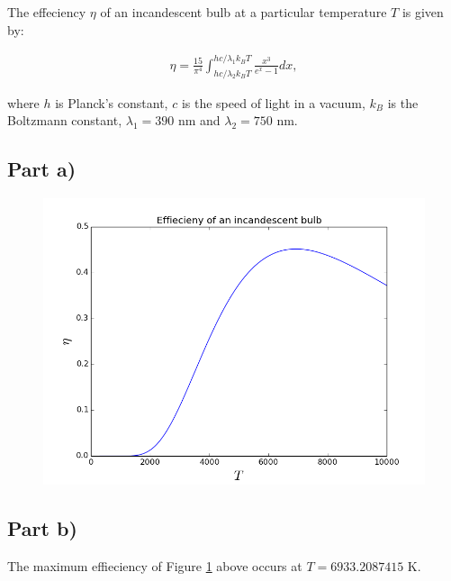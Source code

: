 \documentclass[a4paper,12pt]{article}
\begin{document}
The effeciency $\eta$ of an incandescent bulb at a particular temperature $T$ is given by:

\begin{eqnarray}
\eta = \frac{15}{\pi^4}\int_{hc/\lambda_2 k_B T}^{hc/\lambda_1 k_B T} \frac{x^3}{e^x - 1} dx,
\end{eqnarray}

where $h$ is Planck's constant, $c$ is the speed of light in a vacuum, $k_B$ is the Boltzmann constant, $\lambda_1 = 390$ nm and $\lambda_2 = 750$ nm.

\subsection{Part a)}

\begin{figure}[H]
\centering
\includegraphics[width = \linewidth]{lab4q6a.png}
\caption{}
\label{fig:q6}
\end{figure}

\subsection{Part b)}

The maximum effieciency of Figure \ref{fig:q6} above occurs at $T = 6933.2087415$ K.
\end{document}
